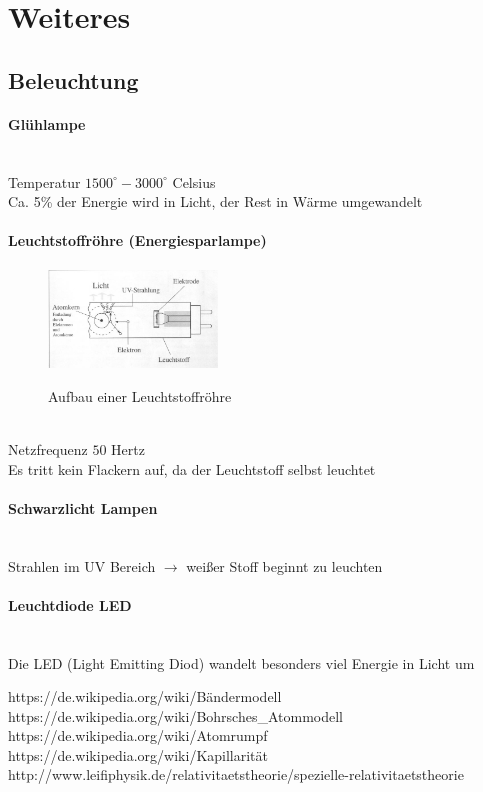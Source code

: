 \documentclass[a4paper,11pt]{article}
\begin{document}
\newpage
\section{Weiteres}
\subsection{Beleuchtung}
\paragraph{Glühlampe}~\\
Temperatur $1500^\circ - 3000^\circ$ Celsius\\
Ca. 5\% der Energie wird in Licht, der Rest in Wärme umgewandelt
\paragraph{Leuchtstoffröhre (Energiesparlampe)}

\begin{figure}[!ht]
\centering
\includegraphics[width=0.4\textwidth]{leuchtstoff.jpg}\\
\caption[http://basics-de.de/Lexikon/GluehlampenBatterien]{Aufbau einer Leuchtstoffröhre}
\end{figure}
~\\
Netzfrequenz $50$ Hertz\\
Es tritt kein Flackern auf, da der Leuchtstoff selbst leuchtet

\paragraph{Schwarzlicht Lampen}~\\
Strahlen im UV Bereich $\to$ weißer Stoff beginnt zu leuchten

\paragraph{Leuchtdiode LED}~\\
Die LED (Light Emitting Diod) wandelt besonders viel Energie in Licht um

\newpage
\begin{thebibliography}{9}
     https://de.wikipedia.org/wiki/Bändermodell
     https://de.wikipedia.org/wiki/Bohrsches\_Atommodell
     https://de.wikipedia.org/wiki/Atomrumpf
     https://de.wikipedia.org/wiki/Kapillarität
     http://www.leifiphysik.de/relativitaetstheorie/spezielle-relativitaetstheorie
\end{thebibliography}

\listoffigures
\end{document}
